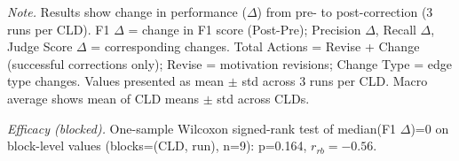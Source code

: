 \begin{table}[H]
\centreing
\begin{minipage}{\linewidth}
\centreing
\caption{Corrector Performance on Ground Truth Data Using Correctness-Based Validation (Baseline Prompt)}
\label{tab:rq1b_groundtruth_correctness}
\begin{threeparttable}
\end{threeparttable}
\vspace{0.5em}
\footnotesize
\textit{Note.} Results show change in performance ($\Delta$) from pre- to post-correction (3 runs per CLD).
F1 $\Delta$ = change in F1 score (Post-Pre); Precision $\Delta$, Recall $\Delta$, Judge Score $\Delta$ = corresponding changes.
Total Actions = Revise + Change (successful corrections only); Revise = motivation revisions; Change Type = edge type changes.
Values presented as mean $\pm$ std across 3 runs per CLD. Macro average shows mean of CLD means $\pm$ std across CLDs.\par
\textit{Efficacy (blocked).} One-sample Wilcoxon signed-rank test of median(F1 $\Delta$)=0 on block-level values (blocks=(CLD, run), n=9): p=0.164, $r_{rb}=-0.56$.

\end{minipage}
\end{table}
